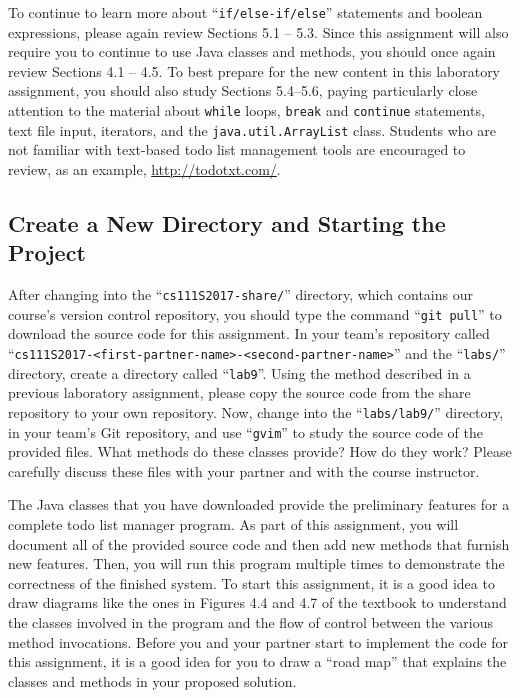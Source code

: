 To continue to learn more about ``{\tt if/else-if/else}'' statements and boolean expressions, please again review
Sections 5.1 -- 5.3. Since this assignment will also require you to continue to use Java classes and methods, you should
once again review Sections 4.1 -- 4.5.  To best prepare for the new content in this laboratory assignment, you should also
study Sections 5.4--5.6, paying particularly close attention to the material about {\tt while} loops, {\tt break} and
{\tt continue} statements, text file input, iterators, and the {\tt java.util.ArrayList} class. Students who are not
familiar with text-based todo list management tools are encouraged to review, as an example, \url{http://todotxt.com/}.

\vspace{-0.1in}
\subsection*{Create a New Directory and Starting the Project}
\vspace{-0.05in}

After changing into the ``{\tt cs111S2017-share/}'' directory, which contains our course's version control repository,
you should type the command ``{\tt git pull}'' to download the source code for this assignment.  In your team's
repository called ``{\tt cs111S2017-<first-partner-name>-<second-partner-name>}'' and the ``{\tt labs/}'' directory, create
a directory called ``{\tt lab9}''. Using the method described in a previous laboratory assignment, please copy the
source code from the share repository to your own repository. Now, change into the ``{\tt labs/lab9/}'' directory, in
your team's Git repository, and use ``{\tt gvim}'' to study the source code of the provided files. What methods do these
classes provide? How do they work? Please carefully discuss these files with your partner and with the course
instructor.

The Java classes that you have downloaded provide the preliminary features for a complete todo list manager program. As
part of this assignment, you will document all of the provided source code and then add new methods that furnish new
features.  Then, you will run this program multiple times to demonstrate the correctness of the finished system. To
start this assignment, it is a good idea to draw diagrams like the ones in Figures 4.4 and 4.7 of the textbook to
understand the classes involved in the program and the flow of control between the various method invocations. Before
you and your partner start to implement the code for this assignment, it is a good idea for you to draw a ``road map''
that explains the classes and methods in your proposed solution.


